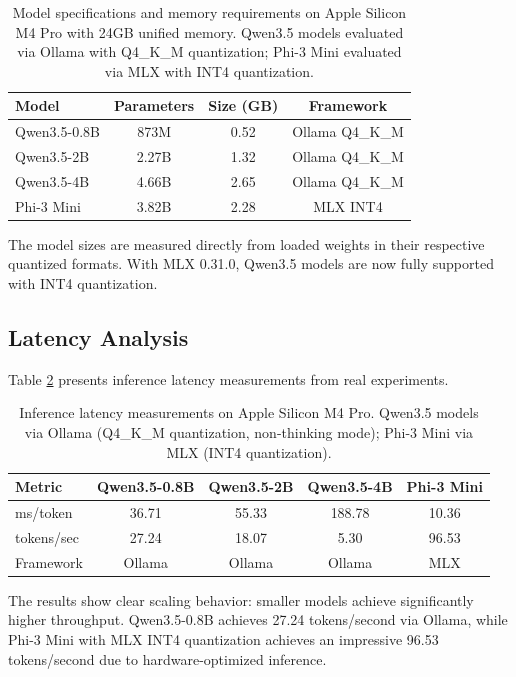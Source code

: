 \documentclass[11pt,a4paper]{article}
\begin{document}
\begin{table}[t]
\centering
\caption{Model specifications and memory requirements on Apple Silicon M4 Pro with 24GB unified memory. Qwen3.5 models evaluated via Ollama with Q4\_K\_M quantization; Phi-3 Mini evaluated via MLX with INT4 quantization.}
\label{tab:memory}
\begin{tabular}{l|ccc}
\toprule
\textbf{Model} & \textbf{Parameters} & \textbf{Size (GB)} & \textbf{Framework} \\
\midrule
Qwen3.5-0.8B & 873M & 0.52 & Ollama Q4\_K\_M \\
Qwen3.5-2B & 2.27B & 1.32 & Ollama Q4\_K\_M \\
Qwen3.5-4B & 4.66B & 2.65 & Ollama Q4\_K\_M \\
Phi-3 Mini & 3.82B & 2.28 & MLX INT4 \\
\bottomrule
\end{tabular}
\end{table}

The model sizes are measured directly from loaded weights in their respective quantized formats. With MLX 0.31.0, Qwen3.5 models are now fully supported with INT4 quantization.

\subsection{Latency Analysis}

Table \ref{tab:latency} presents inference latency measurements from real experiments.

\begin{table}[t]
\centering
\caption{Inference latency measurements on Apple Silicon M4 Pro. Qwen3.5 models via Ollama (Q4\_K\_M quantization, non-thinking mode); Phi-3 Mini via MLX (INT4 quantization).}
\label{tab:latency}
\begin{tabular}{l|cccc}
\toprule
\textbf{Metric} & \textbf{Qwen3.5-0.8B} & \textbf{Qwen3.5-2B} & \textbf{Qwen3.5-4B} & \textbf{Phi-3 Mini} \\
\midrule
ms/token & 36.71 & 55.33 & 188.78 & 10.36 \\
tokens/sec & 27.24 & 18.07 & 5.30 & 96.53 \\
Framework & Ollama & Ollama & Ollama & MLX \\
\bottomrule
\end{tabular}
\end{table}
The results show clear scaling behavior: smaller models achieve significantly higher throughput. Qwen3.5-0.8B achieves 27.24 tokens/second via Ollama, while Phi-3 Mini with MLX INT4 quantization achieves an impressive 96.53 tokens/second due to hardware-optimized inference.
\end{document}
